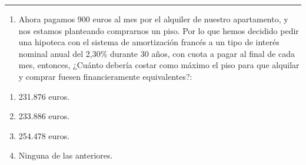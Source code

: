 \documentclass[
  letterpaper,
  DIV=11,
  numbers=noendperiod]{scrreprt}
\providecommand{\tightlist}{%
  \setlength{\itemsep}{0pt}\setlength{\parskip}{0pt}}\usepackage{longtable,booktabs,array}
\begin{document}
\begin{center}\rule{0.5\linewidth}{0.5pt}\end{center}

\begin{enumerate}
\def\labelenumi{\arabic{enumi}.}
\setcounter{enumi}{35}
\tightlist
\item
  Ahora pagamos 900 euros al mes por el alquiler de nuestro apartamento,
  y nos estamos planteando comprarnos un piso. Por lo que hemos decidido
  pedir una hipoteca con el sistema de amortización francés a un tipo de
  interés nominal anual del 2,30\% durante 30 años, con cuota a pagar al
  final de cada mes, entonces, ¿Cuánto debería costar como máximo el
  piso para que alquilar y comprar fuesen financieramente equivalentes?:
\end{enumerate}

\begin{enumerate}
\def\labelenumi{\alph{enumi})}
\item
  231.876 euros.
\item
  233.886 euros.
\item
  254.478 euros.
\item
  Ninguna de las anteriores.
\end{enumerate}
\end{document}
